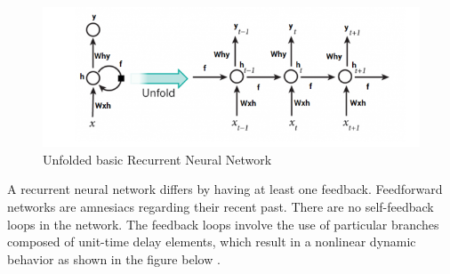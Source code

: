 \begin{figure}[h!]
\centering
\includegraphics[width=0.8\linewidth]{project/rnn.png}
\caption{Unfolded basic Recurrent Neural Network}
\label{fig:felix}
\end{figure}
A recurrent neural network differs by having at least one feedback. Feedforward networks are amnesiacs regarding their recent past. There are no self-feedback loops in the network. The feedback loops involve the use of particular branches composed of unit-time delay elements, which result in a nonlinear dynamic behavior as shown in the figure below \cite{gupta2018fundamentals}.
